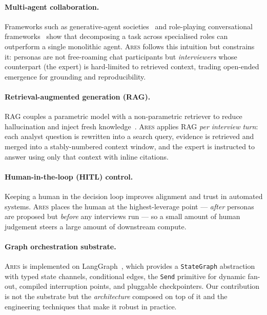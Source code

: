\documentclass[10pt,twocolumn]{article}
\newcommand{\ares}{\textsc{Ares}}
\newcommand{\code}[1]{\texttt{\small #1}}
\begin{document}
\paragraph{Multi-agent collaboration.} Frameworks such as generative-agent
societies~\cite{park2023generative} and role-playing conversational
frameworks~\cite{li2023camel,wu2023autogen} show that decomposing a task across
specialised roles can outperform a single monolithic agent. \ares{} follows this
intuition but constrains it: personas are not free-roaming chat participants but
\emph{interviewers} whose counterpart (the expert) is hard-limited to retrieved
context, trading open-ended emergence for grounding and reproducibility.

\paragraph{Retrieval-augmented generation (RAG).} RAG couples a parametric model
with a non-parametric retriever to reduce hallucination and inject fresh
knowledge~\cite{lewis2020rag}. \ares{} applies RAG \emph{per interview turn}: each
analyst question is rewritten into a search query, evidence is retrieved and
merged into a stably-numbered context window, and the expert is instructed to
answer using only that context with inline citations.

\paragraph{Human-in-the-loop (HITL) control.} Keeping a human in the decision
loop improves alignment and trust in automated systems. \ares{} places the human
at the highest-leverage point --- \emph{after} personas are proposed but
\emph{before} any interviews run --- so a small amount of human judgement steers a
large amount of downstream compute.

\paragraph{Graph orchestration substrate.} \ares{} is implemented on
LangGraph~\cite{langgraph}, which provides a \code{StateGraph} abstraction with
typed state channels, conditional edges, the \code{Send} primitive for dynamic
fan-out, compiled interruption points, and pluggable checkpointers. Our
contribution is not the substrate but the \emph{architecture} composed on top of
it and the engineering techniques that make it robust in practice.

\end{document}
